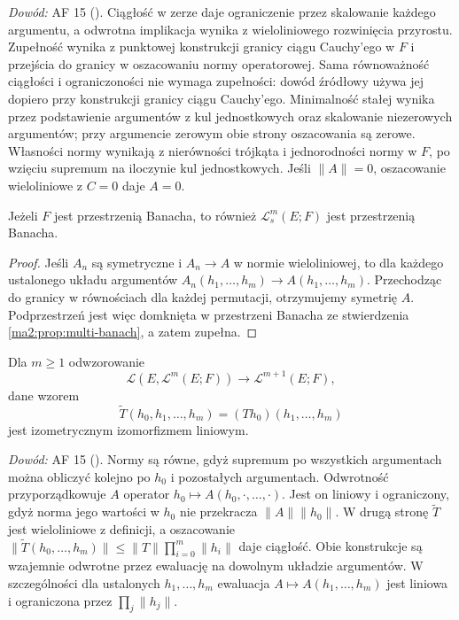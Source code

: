 \emph{Dowód:} AF 15 ().
Ciągłość w zerze daje ograniczenie przez skalowanie
każdego argumentu, a odwrotna implikacja wynika z
wieloliniowego rozwinięcia przyrostu. Zupełność wynika
z punktowej konstrukcji granicy ciągu Cauchy'ego w $F$
i przejścia do granicy w oszacowaniu normy operatorowej.
Sama równoważność ciągłości i ograniczoności nie wymaga
zupełności: dowód źródłowy używa jej dopiero przy
konstrukcji granicy ciągu Cauchy'ego. Minimalność stałej
wynika przez podstawienie argumentów z kul jednostkowych
oraz skalowanie niezerowych argumentów; przy argumencie
zerowym obie strony oszacowania są zerowe.
Własności normy wynikają z nierówności trójkąta
i jednorodności normy w $F$, po wzięciu supremum
na iloczynie kul jednostkowych. Jeśli $\|A\|=0$,
oszacowanie wieloliniowe z $C=0$ daje $A=0$.

\begin{wniosek}
\label{ma2:cor:symmetric-banach}
Jeżeli $F$ jest przestrzenią Banacha, to również
$\mathcal L_s^m(E;F)$ jest przestrzenią Banacha.
\end{wniosek}
\begin{proof}
Jeśli $A_n$ są symetryczne i $A_n\to A$ w normie
wieloliniowej, to dla każdego ustalonego układu argumentów
$A_n(h_1,\ldots,h_m)\to A(h_1,\ldots,h_m)$.
Przechodząc do granicy w równościach dla każdej permutacji,
otrzymujemy symetrię $A$. Podprzestrzeń jest więc domknięta
w przestrzeni Banacha ze stwierdzenia
\ref{ma2:prop:multi-banach}, a zatem zupełna.
\end{proof}

\begin{lemat}
\label{ma2:lem:multi-identification}
Dla $m\ge1$ odwzorowanie
\[
 \mathcal L(E,\mathcal L^m(E;F))\longrightarrow\mathcal L^{m+1}(E;F),
\]
dane wzorem
\[
 \widetilde T(h_0,h_1,\ldots,h_m)
       =(Th_0)(h_1,\ldots,h_m)
\]
jest izometrycznym izomorfizmem liniowym.
\end{lemat}

\emph{Dowód:} AF 15 ().
Normy są równe, gdyż supremum po wszystkich argumentach
można obliczyć kolejno po $h_0$ i pozostałych argumentach.
Odwrotność przyporządkowuje $A$ operator
$h_0\mapsto A(h_0,\cdot,\ldots,\cdot)$.
Jest on liniowy i ograniczony, gdyż norma jego wartości
w $h_0$ nie przekracza $\|A\|\|h_0\|$. W drugą stronę
$\widetilde T$ jest wieloliniowe z definicji, a oszacowanie
$\|\widetilde T(h_0,\ldots,h_m)\|\le\|T\|\prod_{i=0}^m\|h_i\|$
daje ciągłość. Obie konstrukcje są wzajemnie odwrotne
przez ewaluację na dowolnym układzie argumentów.
W szczególności dla ustalonych $h_1,\ldots,h_m$
ewaluacja $A\mapsto A(h_1,\ldots,h_m)$ jest liniowa
i ograniczona przez $\prod_j\|h_j\|$.

